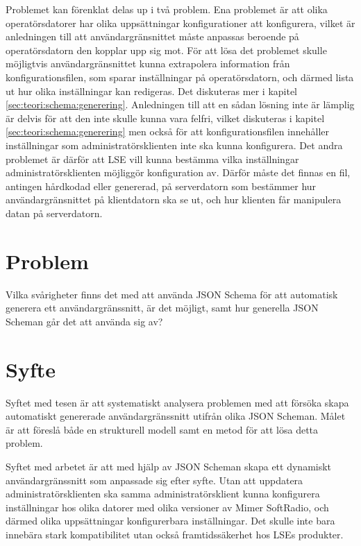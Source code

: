 Problemet kan förenklat delas up i två problem. Ena problemet är att olika operatörsdatorer har olika uppsättningar konfigurationer att konfigurera, vilket är anledningen till att användargränsnittet måste anpassas beroende på operatörsdatorn den kopplar upp sig mot. För att lösa det problemet skulle möjligtvis användargränsnittet kunna extrapolera information från konfigurationsfilen, som sparar inställningar på operatörsdatorn, och därmed lista ut hur olika inställningar kan redigeras. Det diskuteras mer i kapitel \ref{sec:teori:schema:generering}. Anledningen till att en sådan lösning inte är lämplig är delvis för att den inte skulle kunna vara felfri, vilket diskuteras i kapitel \ref{sec:teori:schema:generering} men också för att konfigurationsfilen innehåller inställningar som administratörsklienten inte ska kunna konfigurera. Det andra problemet är därför att LSE vill kunna bestämma vilka inställningar administratörsklienten möjliggör konfiguration av. Därför måste det finnas en fil, antingen hårdkodad eller genererad, på serverdatorn som bestämmer hur användargränsnittet på klientdatorn ska se ut, och hur klienten får manipulera datan på serverdatorn.

\section{Problem}
\label{sec:intro:problem}
Vilka svårigheter finns det med att använda JSON Schema för att automatisk generera ett användargränssnitt, är det möjligt, samt hur generella JSON Scheman går det att använda sig av?

\section{Syfte}
\label{sec:intro:syfte}
Syftet med tesen är att systematiskt analysera problemen med att försöka skapa automatiskt genererade användargränssnitt utifrån olika JSON Scheman. Målet är att föreslå både en strukturell modell samt en metod för att lösa detta problem.

Syftet med arbetet är att med hjälp av JSON Scheman skapa ett dynamiskt användargränssnitt som anpassade sig efter syfte. Utan att uppdatera administratörsklienten ska samma administratörsklient kunna konfigurera inställningar hos olika datorer med olika versioner av Mimer SoftRadio, och därmed olika uppsättningar konfigurerbara inställningar. Det skulle inte bara innebära stark kompatibilitet utan också framtidssäkerhet hos LSEs produkter.

